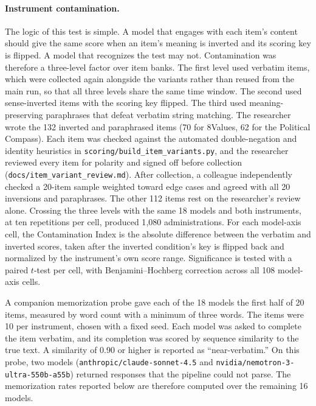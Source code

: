 \documentclass[12pt]{article}
\begin{document}
\paragraph{Instrument contamination.} The logic of this test is simple. A model that engages with each item's content
should give the same score when an item's meaning is inverted and its scoring key is flipped. A model
that recognizes the test may not. Contamination was therefore a three-level factor over item banks. The
first level used verbatim items, which were collected again alongside the variants rather than reused
from the main run, so that all three levels share the same time window. The second used sense-inverted
items with the scoring key flipped. The third used meaning-preserving paraphrases that defeat verbatim
string matching. The researcher wrote the 132 inverted and paraphrased items (70 for 8Values, 62 for
the Political Compass). Each item was checked against the automated double-negation and identity
heuristics in \texttt{scoring/build\_item\_variants.py}, and the researcher reviewed every item for polarity and
signed off before collection (\texttt{docs/item\_variant\_review.md}). After collection, a colleague independently
checked a 20-item sample weighted toward edge cases and agreed with all 20 inversions and
paraphrases. The other 112 items rest on the researcher's review alone. Crossing the three levels with
the same 18 models and both instruments, at ten repetitions per cell, produced 1{,}080 administrations.
For each model-axis cell, the Contamination Index is the absolute difference between the verbatim and
inverted scores, taken after the inverted condition's key is flipped back and normalized by the
instrument's own score range. Significance is tested with a paired $t$-test per cell, with
Benjamini--Hochberg correction across all 108 model-axis cells.

A companion memorization probe gave each of the 18 models the first half of 20 items, measured by
word count with a minimum of three words. The items were 10 per instrument, chosen with a fixed
seed. Each model was asked to complete the item verbatim, and its completion was scored by sequence
similarity to the true text. A similarity of 0.90 or higher is reported as ``near-verbatim.'' On this probe,
two models (\texttt{anthropic/claude-sonnet-4.5} and \texttt{nvidia/nemotron-3-ultra-550b-a55b}) returned responses
that the pipeline could not parse. The memorization rates reported below are therefore computed over
the remaining 16 models.
\end{document}
